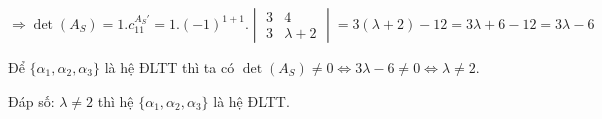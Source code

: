 \documentclass[12pt,a4paper]{article}
\begin{document}
\[ \Rightarrow \det(A_S) = 1.c_{11}^{A_S'} = 1.(-1)^{1+1}.\begin{vmatrix} 3 & 4 \\ 3 & \lambda + 2 \end{vmatrix} = 3(\lambda + 2) - 12 = 3\lambda + 6 - 12 = 3\lambda - 6 \]

Để $\{\alpha_1, \alpha_2, \alpha_3\}$ là hệ ĐLTT
thì ta có $\det(A_S) \neq 0 \Leftrightarrow 3\lambda - 6 \neq 0 \Leftrightarrow \lambda \neq 2$.

Đáp số: $\lambda \neq 2$ thì hệ
$\{\alpha_1, \alpha_2, \alpha_3\}$ là hệ ĐLTT.
\end{document}
